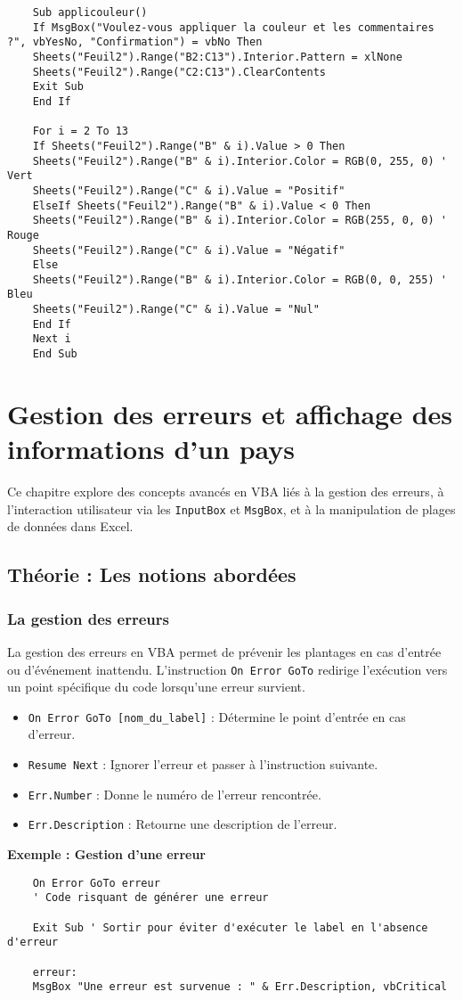 \documentclass[a4paper,12pt]{report}
\begin{document}
\begin{lstlisting}
	Sub applicouleur()
	If MsgBox("Voulez-vous appliquer la couleur et les commentaires ?", vbYesNo, "Confirmation") = vbNo Then
	Sheets("Feuil2").Range("B2:C13").Interior.Pattern = xlNone
	Sheets("Feuil2").Range("C2:C13").ClearContents
	Exit Sub
	End If
	
	For i = 2 To 13
	If Sheets("Feuil2").Range("B" & i).Value > 0 Then
	Sheets("Feuil2").Range("B" & i).Interior.Color = RGB(0, 255, 0) ' Vert
	Sheets("Feuil2").Range("C" & i).Value = "Positif"
	ElseIf Sheets("Feuil2").Range("B" & i).Value < 0 Then
	Sheets("Feuil2").Range("B" & i).Interior.Color = RGB(255, 0, 0) ' Rouge
	Sheets("Feuil2").Range("C" & i).Value = "Négatif"
	Else
	Sheets("Feuil2").Range("B" & i).Interior.Color = RGB(0, 0, 255) ' Bleu
	Sheets("Feuil2").Range("C" & i).Value = "Nul"
	End If
	Next i
	End Sub
\end{lstlisting}

\chapter{Gestion des erreurs et affichage des informations d'un pays}

Ce chapitre explore des concepts avancés en VBA liés à la gestion des erreurs, à l'interaction utilisateur via les \texttt{InputBox} et \texttt{MsgBox}, et à la manipulation de plages de données dans Excel.

\section{Théorie : Les notions abordées}

\subsection{La gestion des erreurs}

La gestion des erreurs en VBA permet de prévenir les plantages en cas d'entrée ou d'événement inattendu. L'instruction \texttt{On Error GoTo} redirige l'exécution vers un point spécifique du code lorsqu'une erreur survient.

\begin{itemize}
	\item \texttt{On Error GoTo [nom\_du\_label]} : Détermine le point d'entrée en cas d'erreur.
	\item \texttt{Resume Next} : Ignorer l'erreur et passer à l'instruction suivante.
	\item \texttt{Err.Number} : Donne le numéro de l'erreur rencontrée.
	\item \texttt{Err.Description} : Retourne une description de l'erreur.
\end{itemize}
\newpage
\textbf{Exemple : Gestion d'une erreur}
\begin{lstlisting}
	On Error GoTo erreur
	' Code risquant de générer une erreur
	
	Exit Sub ' Sortir pour éviter d'exécuter le label en l'absence d'erreur
	
	erreur:
	MsgBox "Une erreur est survenue : " & Err.Description, vbCritical
\end{lstlisting}
\end{document}
